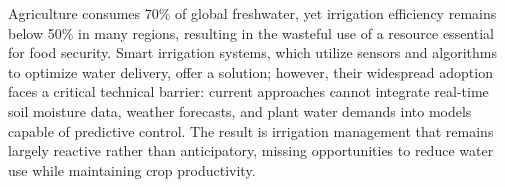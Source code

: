 \documentclass[pdflatex,sn-nature]{sn-jnl}%
\theoremstyle{thmstyleone}%
\theoremstyle{thmstyletwo}%
\theoremstyle{thmstylethree}%
\begin{document}





\maketitle

Agriculture consumes 70\% of global freshwater\cite{scanlon2023}, yet irrigation efficiency remains below 50\% in many regions\cite{Mehta2024}, resulting in the wasteful use of a resource essential for food security. Smart irrigation systems, which utilize sensors and algorithms to optimize water delivery, offer a solution; however, their widespread adoption faces a critical technical barrier: current approaches cannot integrate real-time soil moisture data, weather forecasts, and plant water demands into models capable of predictive control. The result is irrigation management that remains largely reactive rather than anticipatory, missing opportunities to reduce water use while maintaining crop productivity.

\end{document}
